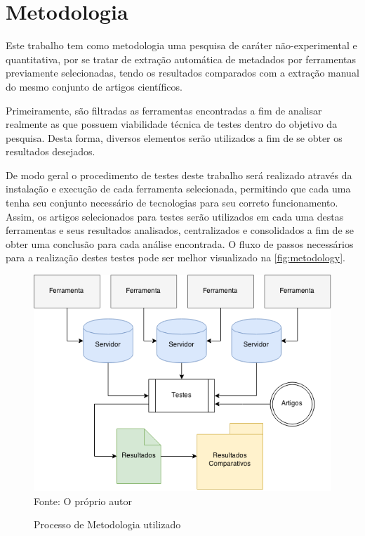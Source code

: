 
\chapter{Metodologia}
\label{cha:methodology}

Este trabalho tem como metodologia uma pesquisa de caráter não-experimental e quantitativa, por se tratar de extração automática de metadados por ferramentas previamente selecionadas, tendo os resultados comparados com a extração manual do mesmo conjunto de artigos científicos.


Primeiramente, são filtradas as ferramentas encontradas a fim de analisar realmente as que possuem viabilidade técnica de testes dentro do objetivo da pesquisa. Desta forma, diversos elementos serão utilizados a fim de se obter os resultados desejados.


De modo geral o procedimento de testes deste trabalho será realizado através da instalação e execução de cada ferramenta selecionada, permitindo que cada uma tenha seu conjunto necessário de tecnologias para seu correto funcionamento. Assim, os artigos selecionados para testes serão utilizados em cada uma destas ferramentas e seus resultados analisados, centralizados e consolidados a fim de se obter uma conclusão para cada análise encontrada. O fluxo de passos necessários para a realização destes testes pode ser melhor visualizado na \autoref{fig:metodology}.

\begin{figure}
    \centering
    \caption{Processo de Metodologia utilizado}
    \label{fig:metodology}
    \includegraphics[width=0.8\linewidth]{./assets/images/metodology}
    \center\footnotesize{Fonte: O próprio autor}
\end{figure}


